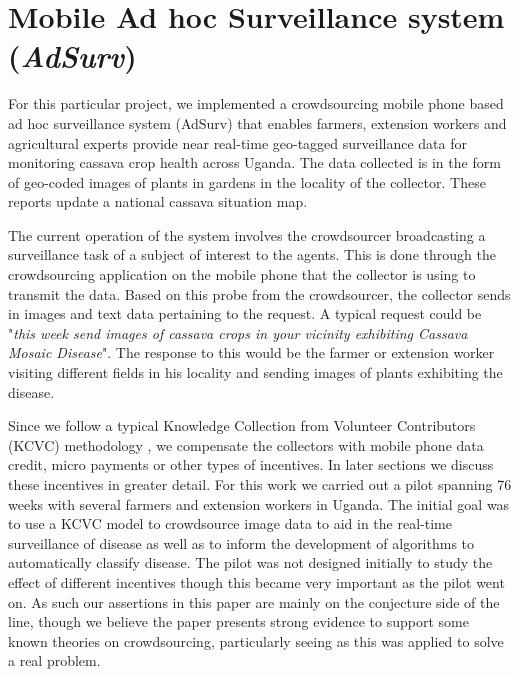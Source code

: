 \documentclass[letterpaper]{article} %
\begin{document}
\section{Mobile Ad hoc Surveillance system (\emph{AdSurv}) }

For this particular project, we implemented a crowdsourcing mobile phone based ad hoc surveillance system (AdSurv) that enables farmers, extension workers and agricultural experts provide near real-time geo-tagged surveillance data for monitoring cassava crop health across Uganda. The data collected is in the form of geo-coded images of plants in gardens in the locality of the collector. These reports update a national cassava situation map. 

The current operation of the system involves the crowdsourcer broadcasting a surveillance task of a subject of interest to the agents. This is done through the crowdsourcing application on the mobile phone that the collector is using to transmit the data. Based on this probe from the crowdsourcer, the collector sends in images and text data pertaining to the request. A typical request could be "\emph{this week send images of cassava crops in your vicinity exhibiting Cassava Mosaic Disease}". The response to this would be the farmer or extension worker visiting different fields in his locality and sending images of plants exhibiting the disease. 

Since we follow a typical Knowledge Collection from Volunteer Contributors (KCVC) methodology \cite{chklovski2005towards}, we compensate the collectors with mobile phone data credit, micro payments or other types of incentives. In later sections we discuss these incentives in greater detail. For this work we carried out a pilot spanning 76 weeks with several farmers and extension workers in Uganda. The initial goal was to use a KCVC model to crowdsource image data to aid in the real-time surveillance of disease  as well as to inform the development of algorithms to automatically classify disease. The pilot was not designed initially to study the effect of different incentives though this became very important as the pilot went on. As such our assertions in this paper are mainly on the conjecture side of the line, though we believe the paper presents strong evidence to support some known theories on crowdsourcing, particularly seeing as this was applied to solve a real problem. 
\end{document}
